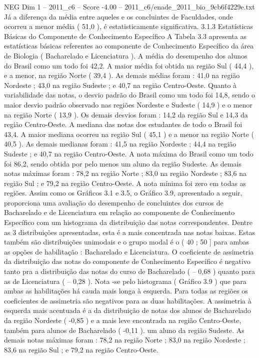 \begin{textsample}{NEG Dim 1 – 2011\_c6 – Score -4.00 – 2011\_c6/enade\_2011\_bio\_9cb6f4229e.txt}
Já a diferença da média entre aqueles e os concluintes de Faculdades, onde ocorreu a menor média ( 51,0 ), é estatisticamente significativa. 3.1.3 Estatísticas Básicas do Componente de Conhecimento Específico A Tabela 3.3 apresenta as estatísticas básicas referentes ao componente de Conhecimento Específico da área de Biologia ( Bacharelado e Licenciatura ).
A média do desempenho dos alunos do Brasil como um todo foi 42,2.
A maior média foi obtida na região Sul ( 44,4 ), e a menor, na região Norte ( 39,4 ).
As demais médias foram : 41,0 na região Nordeste ; 43,0 na região Sudeste ; e 40,7 na região Centro-Oeste.
Quanto à variabilidade das notas, o desvio padrão do Brasil como um todo foi 14,8, sendo o maior desvio padrão observado nas regiões Nordeste e Sudeste ( 14,9 ) e o menor na região Norte ( 13,9 ).
Os demais desvios foram : 14,2 da região Sul e 14,3 da região Centro-Oeste.
A mediana das notas dos estudantes de todo o Brasil foi 43,4.
A maior mediana ocorreu na região Sul ( 45,1 ) e a menor na região Norte ( 40,5 ).
As demais medianas foram : 41,5 na região Nordeste ; 44,4 na região Sudeste ; e 40,7 na região Centro-Oeste.
A nota máxima do Brasil como um todo foi 86,2, sendo obtida por pelo menos um aluno da região Sudeste.
As demais notas máximas foram : 78,2 na região Norte ; 83,0 na região Nordeste ; 83,6 na região Sul ; e 79,2 na região Centro-Oeste.
A nota mínima foi zero em todas as regiões.
Assim como os Gráficos 3.1 e 3.5, o Gráfico 3.9, apresentado a seguir, proporciona uma avaliação do desempenho de concluintes dos cursos de Bacharelado e de Licenciatura em relação ao componente de Conhecimento Específico com um histograma da distribuição das notas correspondentes.
Dentre as 3 distribuições apresentadas, esta é a mais concentrada nas notas baixas.
Estas também são distribuições unimodais e o grupo modal é o ( 40 ; 50 ] para ambas as opções de habilitação : Bacharelado e Licenciatura.
O coeficiente de assimetria da distribuição das notas do componente de Conhecimento Específico é negativo tanto pra a distribuição das notas do curso de Bacharelado ( – 0,68 ) quanto para as de Licenciatura ( – 0,28 ).
Nota -se pelo histograma ( Gráfico 3.9 ) que para ambas as habilitações há cauda mais longa à esquerda.
Para todas as regiões os coeficientes de assimetria são negativos para as duas habilitações.
A assimetria à esquerda mais acentuada é a da distribuição de notas dos alunos de Bacharelado da região Nordeste ( -0,85 ) e a mais leve encontrada na região Centro-Oeste, também para alunos de Bacharelado ( -0,11 ). um aluno da região Sudeste.
As demais notas máximas foram : 78,2 na região Norte ; 83,0 na região Nordeste ; 83,6 na região Sul ; e 79,2 na região Centro-Oeste.

\end{textsample}
